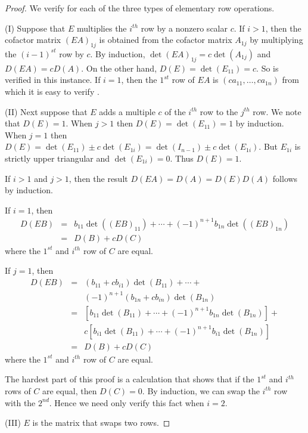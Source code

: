 \documentclass{ximera}
\begin{document}
\begin{proof} We verify  for each of the three types of
elementary row operations. 

\noindent (I) Suppose that $E$ multiplies the $i^{th}$ row by a
nonzero scalar $c$.  If $i>1$, then the cofactor matrix
$(EA)_{1j}$ is obtained from the cofactor matrix $A_{1j}$ by
multiplying the $(i-1)^{st}$ row by $c$.  By induction,
$\det(EA)_{1j}= c\det(A_{1j})$ and $D(EA)=cD(A)$.  On the other
hand, $D(E)=\det(E_{11})=c$.  So  is verified in
this instance.  If $i=1$, then the $1^{st}$ row of $EA$ is
$(ca_{11},\ldots,ca_{1n})$ from which it is easy to verify
.

\noindent (II) Next suppose that $E$ adds a multiple $c$ of the
$i^{th}$ row to the $j^{th}$ row.  We note that $D(E)=1$.  When
$j>1$ then $D(E)=\det(E_{11})=1$ by induction.  When $j=1$ then
$D(E)= \det(E_{11})\pm c\det(E_{1i})=\det(I_{n-1})\pm
c\det(E_{1i})$. But $E_{1i}$ is strictly upper triangular and
$\det(E_{1i})=0$.  Thus $D(E)=1$. 

If $i>1$ and $j>1$, then the result $D(EA)=D(A)=D(E)D(A)$
follows by induction.  

If $i=1$, then
\begin{eqnarray*}
D(EB) & = & b_{11}\det((EB)_{11})+\cdots+(-1)^{n+1}b_{1n}\det((EB)_{1n})\\
& = & D(B) + cD(C)
\end{eqnarray*}
where the $1^{st}$ and $i^{th}$ row of $C$ are equal.

If $j=1$, then 
\begin{eqnarray*}
  D(EB) & = & (b_{11}+cb_{i1})\det(B_{11}) +\cdots+ \\
   & & (-1)^{n+1}(b_{1n}+cb_{in})\det(B_{1n})\\
& = &
\left[b_{11}\det(B_{11})+\cdots+(-1)^{n+1}b_{1n}\det(B_{1n})\right]
+ 
\\ & & 
        c\left[b_{i1}\det(B_{11})+\cdots+(-1)^{n+1}b_{i1}\det(B_{1n})\right]\\
& = & D(B) + cD(C)
\end{eqnarray*}
where the $1^{st}$ and $i^{th}$ row of $C$ are equal.  

The hardest part of this proof is a calculation that shows that
if the $1^{st}$ and $i^{th}$ rows of $C$ are equal, then
$D(C)=0$.  By induction, we can swap the $i^{th}$ row with the
$2^{nd}$.  Hence we need only verify this fact when $i=2$. 

\noindent (III) $E$ is the matrix that swaps two rows.   


\end{proof}
\end{document}
